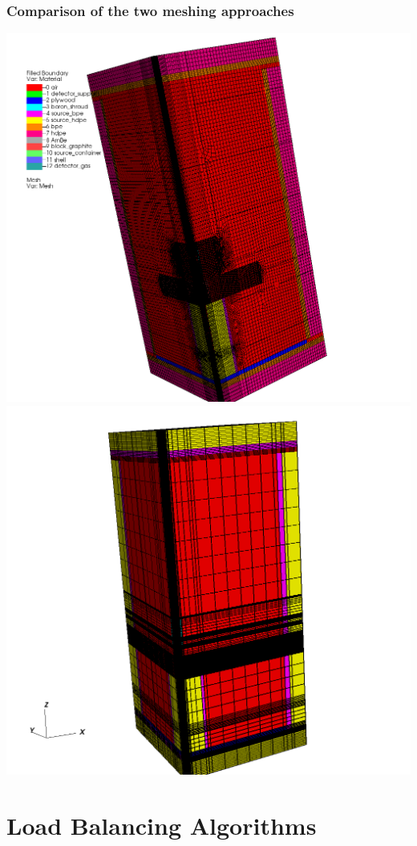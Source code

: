 \documentclass[xcolor={usenames,dvipsnames,svgnames,table}]{beamer}
\begin{document}
\begin{frame}[t]\frametitle{Comparison of the two meshing approaches}
\centering
\includegraphics[scale=0.17]{../figures/im1_228.png}
\includegraphics[scale=0.17]{../figures/im1c_prism.png}
\end{frame}

\section{Load Balancing Algorithms}
\end{document}
